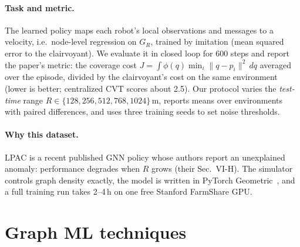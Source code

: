 \documentclass{article}
\begin{document}
\paragraph{Task and metric.}
The learned policy maps each robot's local observations and messages to a velocity, i.e.\ node-level regression on $G_R$, trained by imitation (mean squared error to the clairvoyant). We evaluate it in closed loop for 600 steps and report the paper's metric: the coverage cost $J=\int\phi(q)\min_i\|q-p_i\|^2\,dq$ averaged over the episode, divided by the clairvoyant's cost on the same environment (lower is better; centralized CVT scores about 2.5). Our protocol varies the \emph{test-time} range $R\in\{128,256,512,768,1024\}$\,m, reports means over environments with paired differences, and uses three training seeds to set noise thresholds.

\paragraph{Why this dataset.}
LPAC is a recent published GNN policy whose authors report an unexplained anomaly: performance degrades when $R$ grows (their Sec.~VI-H). The simulator controls graph density exactly, the model is written in PyTorch Geometric~\citep{fey2019pyg}, and a full training run takes 2--4\,h on one free Stanford FarmShare GPU.

\section{Graph ML techniques}
\end{document}
